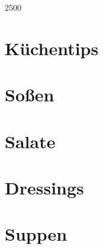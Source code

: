 \documentclass[10pt, a4paper, twoside]{book} %
\makeatletter
\newcommand\GRAANDE{\@setfontsize\Huge{250}{0}}
\makeatother
\begin{document}
\renewcommand{\indexname}{S\-t\-i\-c\-h\-w\-o\-r\-t\-v\-e\-r\-z\-e\-i\-c\-h\-n\-i\-s}

\justify
\setlength\parindent{0pt}

\thispagestyle{empty}
\vspace*{3cm}
\begin{center}
{\GRAANDE{\textsc{}}}
\vspace{2cm}
\end{center}
\vspace{3cm}
\newpage

\tableofcontents

\cleardoublepage
\printindex

\cleardoublepage
{}

\chapter{K\-ü\-c\-h\-e\-n\-t\-i\-p\-s}
\thispagestyle{empty}

\chapter{S\-o\-ß\-e\-n}
\thispagestyle{empty}
\newpage




\chapter{S\-a\-l\-a\-t\-e}
\thispagestyle{empty}
\newpage






\chapter{D\-r\-e\-s\-s\-i\-n\-g\-s}
\thispagestyle{empty}
\newpage




\chapter{S\-u\-p\-p\-e\-n}
\thispagestyle{empty}
\newpage




\end{document}
